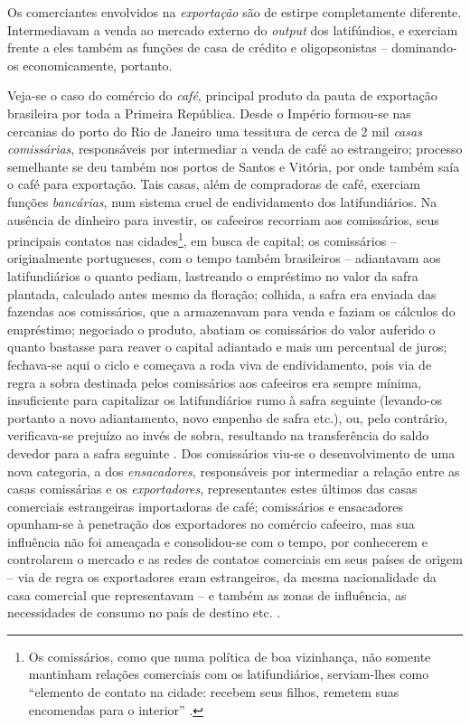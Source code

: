 Os comerciantes envolvidos na \textit{exportação} são de estirpe completamente diferente. Intermediavam a venda ao mercado externo do \textit{output} dos latifúndios, e exerciam frente a eles também as funções de casa de crédito e oligopsonistas -- dominando-os economicamente, portanto. 

Veja-se o caso do comércio do \textit{café}, principal produto da pauta de exportação brasileira por toda a Primeira República. Desde o Império formou-se nas cercanias do porto do Rio de Janeiro uma tessitura de cerca de 2 mil \textit{casas comissárias}, responsáveis por intermediar a venda de café ao estrangeiro; processo semelhante se deu também nos portos de Santos e Vitória, por onde também saía o café para exportação. Tais casas, além de compradoras de café, exerciam funções \textit{bancárias}, num sistema cruel de endividamento dos latifundiários. Na ausência de dinheiro para investir, os cafeeiros recorriam aos comissários, seus principais contatos nas cidades\footnote{Os comissários, como que numa política de boa vizinhança, não somente mantinham relações comerciais com os latifundiários, serviam-lhes como ``elemento de contato na cidade: recebem seus filhos, remetem suas encomendas para o interior'' \cite[p.~36]{CARONE1970inst}.}, em busca de capital; os comissários -- originalmente portugueses, com o tempo também brasileiros -- adiantavam aos latifundiários o quanto pediam, lastreando o empréstimo no valor da safra plantada, calculado antes mesmo da floração; colhida, a safra era enviada das fazendas aos comissários, que a armazenavam para venda e faziam os cálculos do empréstimo; negociado o produto, abatiam os comissários do valor auferido o quanto bastasse para reaver o capital adiantado e mais um percentual de juros; fechava-se aqui o ciclo e começava a roda viva de endividamento, pois via de regra a sobra destinada pelos comissários aos cafeeiros era sempre mínima, insuficiente para capitalizar os latifundiários rumo à safra seguinte (levando-os portanto a novo adiantamento, novo empenho de safra etc.), ou, pelo contrário, verificava-se prejuízo ao invés de sobra, resultando na transferência do saldo devedor para a safra seguinte \cite[pp.~36-37]{CARONE1970inst}. Dos comissários viu-se o desenvolvimento de uma nova categoria, a dos \textit{ensacadores}, responsáveis por intermediar a relação entre as casas comissárias e os \textit{exportadores}, representantes estes últimos das casas comerciais estrangeiras importadoras de café; comissários e ensacadores opunham-se à penetração dos exportadores no comércio cafeeiro, mas sua influência não foi ameaçada e consolidou-se com o tempo, por conhecerem e controlarem o mercado e as redes de contatos comerciais em seus países de origem -- via de regra os exportadores eram estrangeiros, da mesma nacionalidade da casa comercial que representavam -- e também as zonas de influência, as necessidades de consumo no país de destino etc. \cite[pp.~37-38]{CARONE1970inst}.


